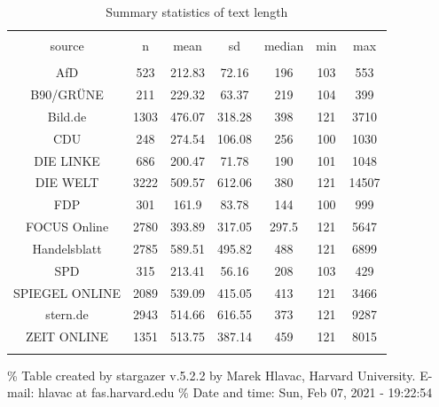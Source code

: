 \documentclass[
]{article}
\begin{document}
\begin{table}[!htbp] \centering 
  \caption{Summary statistics of text length} 
  \label{table:text_length} 
\begin{tabular}{@{\extracolsep{5pt}} ccccccc} 
\\[-1.8ex]\hline 
\hline \\[-1.8ex] 
source & n & mean & sd & median & min & max \\ 
\hline \\[-1.8ex] 
AfD & 523 & 212.83 & 72.16 & 196 & 103 & 553 \\ 
B90/GRÜNE & 211 & 229.32 & 63.37 & 219 & 104 & 399 \\ 
Bild.de & 1303 & 476.07 & 318.28 & 398 & 121 & 3710 \\ 
CDU & 248 & 274.54 & 106.08 & 256 & 100 & 1030 \\ 
DIE LINKE & 686 & 200.47 & 71.78 & 190 & 101 & 1048 \\ 
DIE WELT & 3222 & 509.57 & 612.06 & 380 & 121 & 14507 \\ 
FDP & 301 & 161.9 & 83.78 & 144 & 100 & 999 \\ 
FOCUS Online & 2780 & 393.89 & 317.05 & 297.5 & 121 & 5647 \\ 
Handelsblatt & 2785 & 589.51 & 495.82 & 488 & 121 & 6899 \\ 
SPD & 315 & 213.41 & 56.16 & 208 & 103 & 429 \\ 
SPIEGEL ONLINE & 2089 & 539.09 & 415.05 & 413 & 121 & 3466 \\ 
stern.de & 2943 & 514.66 & 616.55 & 373 & 121 & 9287 \\ 
ZEIT ONLINE & 1351 & 513.75 & 387.14 & 459 & 121 & 8015 \\ 
\hline \\[-1.8ex] 
\end{tabular} 
\end{table}

\% Table created by stargazer v.5.2.2 by Marek Hlavac, Harvard
University. E-mail: hlavac at fas.harvard.edu \% Date and time: Sun, Feb
07, 2021 - 19:22:54
\end{document}
